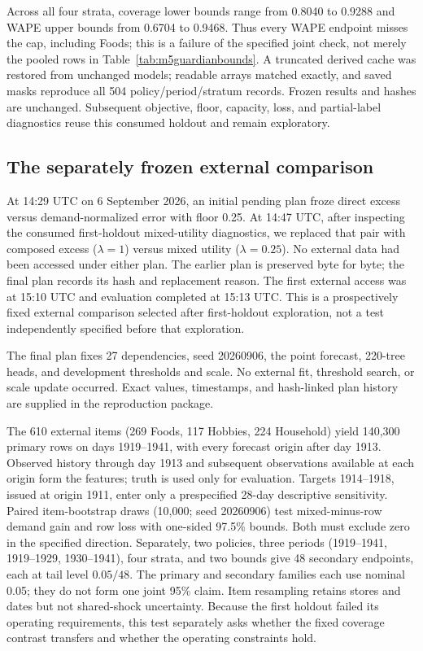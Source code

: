 
Across all four strata, coverage lower bounds range from 0.8040 to 0.9288 and WAPE upper bounds from 0.6704 to 0.9468. Thus every WAPE endpoint misses the cap, including Foods; this is a failure of the specified joint check, not merely the pooled rows in Table~\ref{tab:m5guardianbounds}.
A truncated derived cache was restored from unchanged models; readable arrays matched exactly, and saved masks reproduce all 504 policy/period/stratum records. Frozen results and hashes are unchanged. Subsequent objective, floor, capacity, loss, and partial-label diagnostics reuse this consumed holdout and remain exploratory.

\subsection{The separately frozen external comparison}
\label{app:external}
At 14:29 UTC on 6 September 2026, an initial pending plan froze direct excess versus demand-normalized error with floor 0.25. At 14:47 UTC, after inspecting the consumed first-holdout mixed-utility diagnostics, we replaced that pair with composed excess ($\lambda=1$) versus mixed utility ($\lambda=0.25$). No external data had been accessed under either plan. The earlier plan is preserved byte for byte; the final plan records its hash and replacement reason. The first external access was at 15:10 UTC and evaluation completed at 15:13 UTC. This is a prospectively fixed external comparison selected after first-holdout exploration, not a test independently specified before that exploration.

The final plan fixes 27 dependencies, seed 20260906, the point forecast, 220-tree heads, and development thresholds and scale. No external fit, threshold search, or scale update occurred. Exact values, timestamps, and hash-linked plan history are supplied in the reproduction package.

The 610 external items (269 Foods, 117 Hobbies, 224 Household) yield 140,300 primary rows on days 1919--1941, with every forecast origin after day 1913. Observed history through day 1913 and subsequent observations available at each origin form the features; truth is used only for evaluation. Targets 1914--1918, issued at origin 1911, enter only a prespecified 28-day descriptive sensitivity. Paired item-bootstrap draws (10,000; seed 20260906) test mixed-minus-row demand gain and row loss with one-sided 97.5\% bounds. Both must exclude zero in the specified direction. Separately, two policies, three periods (1919--1941, 1919--1929, 1930--1941), four strata, and two bounds give 48 secondary endpoints, each at tail level $0.05/48$. The primary and secondary families each use nominal 0.05; they do not form one joint 95\% claim. Item resampling retains stores and dates but not shared-shock uncertainty. Because the first holdout failed its operating requirements, this test separately asks whether the fixed coverage contrast transfers and whether the operating constraints hold.

